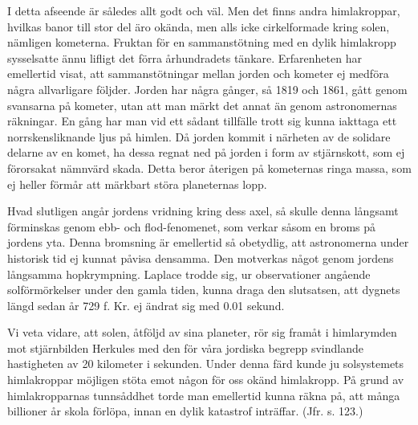 \documentclass[a4paper, 12pt, oneside, swedish]{article}
\begin{document}
I detta afseende är således allt godt och väl. Men det finns andra himlakroppar, hvilkas banor till stor del äro okända, men alls icke cirkelformade kring solen, nämligen kometerna. Fruktan för en sammanstötning med en dylik himlakropp sysselsatte ännu lifligt det förra århundradets tänkare. Erfarenheten har emellertid visat, att sammanstötningar mellan jorden och kometer ej medföra några allvarligare följder. Jorden har några gånger, så 1819 och 1861, gått genom svansarna på kometer, utan att man märkt det annat än genom astronomernas räkningar. En gång har man vid ett sådant tillfälle trott sig kunna iakttaga ett norrskensliknande ljus på himlen. Då jorden kommit i närheten av de solidare delarne av en komet, ha dessa regnat ned på jorden i form av stjärnskott, som ej förorsakat nämnvärd skada. Detta beror återigen på kometernas ringa massa, som ej heller förmår att märkbart störa planeternas lopp.

Hvad slutligen angår jordens vridning kring dess axel, så skulle denna långsamt förminskas genom ebb- och flod-fenomenet, som verkar såsom en broms på jordens yta. Denna bromsning är emellertid så obetydlig, att astronomerna under historisk tid ej kunnat påvisa densamma. Den motverkas något genom jordens långsamma hopkrympning. Laplace trodde sig, ur observationer angående solförmörkelser under den gamla tiden, kunna draga den slutsatsen, att dygnets längd sedan år 729 f. Kr. ej ändrat sig med 0.01 sekund.

Vi veta vidare, att solen, åtföljd av sina planeter, rör sig framåt i himlarymden mot stjärnbilden Herkules med den för våra jordiska begrepp svindlande hastigheten av 20 kilometer i sekunden. Under denna färd kunde ju solsystemets himlakroppar möjligen stöta emot någon för oss okänd himlakropp. På grund av himlakropparnas tunnsåddhet torde man emellertid kunna räkna på, att många billioner år skola förlöpa, innan en dylik katastrof inträffar. (Jfr. s. 123.)
\end{document}

